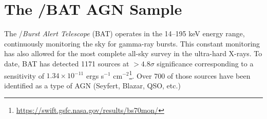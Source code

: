 \section{The \swift/BAT AGN Sample}\label{sample}
The  \swift/\textit{Burst Alert Telescope} (BAT) \citep{10.1007/s11214-005-5096-3,Gehrels:2004qf} operates in the 14--195 keV energy range, continuously monitoring the sky for gamma-ray bursts. This constant monitoring has also allowed for the most complete all-sky survey in the ultra-hard X-rays. To date, BAT has detected 1171 sources at  $>4.8\sigma$ significance corresponding to a sensitivity of $1.34\times10^{-11}$ ergs s$^{-1}$ cm$^{-2}$\footnote{\url{https://swift.gsfc.nasa.gov/results/bs70mon/}}. Over 700 of those sources have been identified as a type of AGN (Seyfert, Blazar, QSO, etc.)

